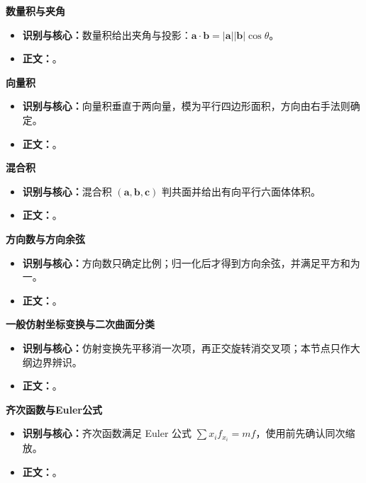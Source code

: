 \begin{knowledgeBox}
\textbf{数量积与夹角}

\begin{itemize}
  \item \textbf{识别与核心：}数量积给出夹角与投影：\(\mathbf a\cdot\mathbf b=|\mathbf a||\mathbf b|\cos\theta\)。
  \item \textbf{正文：}。
\end{itemize}

\textbf{向量积}

\begin{itemize}
  \item \textbf{识别与核心：}向量积垂直于两向量，模为平行四边形面积，方向由右手法则确定。
  \item \textbf{正文：}。
\end{itemize}

\textbf{混合积}

\begin{itemize}
  \item \textbf{识别与核心：}混合积 \((\mathbf a,\mathbf b,\mathbf c)\) 判共面并给出有向平行六面体体积。
  \item \textbf{正文：}。
\end{itemize}

\textbf{方向数与方向余弦}

\begin{itemize}
  \item \textbf{识别与核心：}方向数只确定比例；归一化后才得到方向余弦，并满足平方和为一。
  \item \textbf{正文：}。
\end{itemize}

\textbf{一般仿射坐标变换与二次曲面分类}

\begin{itemize}
  \item \textbf{识别与核心：}仿射变换先平移消一次项，再正交旋转消交叉项；本节点只作大纲边界辨识。
  \item \textbf{正文：}。
\end{itemize}

\textbf{齐次函数与Euler公式}

\begin{itemize}
  \item \textbf{识别与核心：}齐次函数满足 Euler 公式 \(\sum x_i f_{x_i}=m f\)，使用前先确认同次缩放。
  \item \textbf{正文：}。
\end{itemize}

\end{knowledgeBox}
